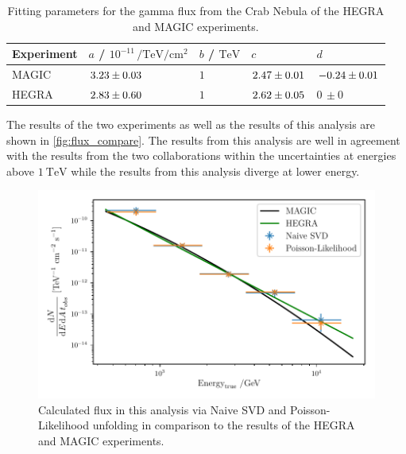 \begin{table}[tb]
  \centering
  \caption{Fitting parameters for the gamma flux from the Crab Nebula of the HEGRA and MAGIC experiments.}
  \begin{tabular}{l l l l l}
    \toprule
    Experiment & $a$ / $10^{-11}\,\si{\per\tera\eV\per\cm\squared}$ & $b$ / $\si{\tera\eV}$  & $c$ & $d$ \\
    \midrule
    MAGIC & $\num{3.23 \pm .03}$ & $\num{1}$ & $\num{2.47 \pm .01}$ & $\num{-0.24 \pm .01}$ \\
    HEGRA & $\num{2.83 \pm .6}$ & $\num{1}$ & $\num{2.62 \pm .05}$ & $0\,\pm 0$ \\
    \bottomrule
  \end{tabular}
  \label{tab:meas}
\end{table}
The results of the two experiments as well as the results of this analysis are shown in \autoref{fig:flux_compare}. The results from this analysis are well in agreement with the results from the two collaborations within the uncertainties at energies above $\SI{1}{\tera\eV}$ while the results from this analysis diverge at lower energy.

\begin{figure}[tb]
  \centering
  \includegraphics[width=.7\textwidth]{plots/flux_compare.pdf}
  \caption{Calculated flux in this analysis via Naive SVD and Poisson-Likelihood unfolding in comparison to the results of the HEGRA and MAGIC experiments.}
  \label{fig:flux_compare}
\end{figure}
